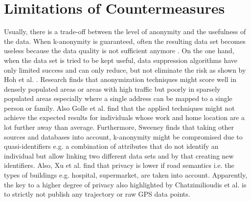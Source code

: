 \section{Limitations of Countermeasures}
Usually, there is a trade-off between the level of anonymity and the usefulness of the data. When k-anonymity is guaranteed, often the resulting data set becomes useless because the data quality is not sufficient anymore \parencite{krumm, cellphone, k-anonymity-old, k-anonymity, k-anonymity-achieving}.
On the one hand, when the data set is tried to be kept useful, data suppression algorithms have only limited success and can only reduce, but not eliminate the risk as shown by Hoh et al. \parencite{hoh2006enhancing}. Research \parencite{time-to-confusion, location-privacy, hoh2006enhancing} finds that anonymization techniques might score well in densely populated areas or areas with high traffic but poorly in sparsely populated areas especially where a single address can be mapped to a single person or family. Also Golle et al. \parencite{privacy-home-work-pairs} find that the applied techniques might not achieve the expected results for individuals whose work and home location are a lot further away than average.
Furthermore, Sweeney \parencite{k-anonymity-achieving} finds that taking other sources and databases into account, k-anonymity might be compromised due to quasi-identifiers e.g. a combination of attributes that do not identify an individual but allow linking two different data sets and by that creating new identifiers. Also, Xu et al. \parencite{xu2018location} find that privacy is lower if road semantics i.e. the types of buildings e.g. hospital, supermarket, are taken into account.
Apparently, the key to a higher degree of privacy also highlighted by Chatzimilioudis et al. \parencite{chatzimilioudis2012crowdsourcing} is to strictly not publish any trajectory or raw GPS data points.